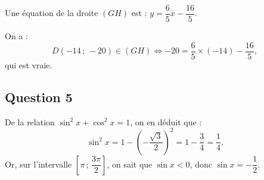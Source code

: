 Une équation de la droite \( (GH) \) est : \( y = \dfrac{6}{5}x - \dfrac{16}{5} \).

On a :
\[
D(-14 \,;\, -20) \in (GH) \iff -20 = \dfrac{6}{5} \times (-14) - \dfrac{16}{5},
\]
qui est vraie.


\subsection*{Question 5}

De la relation \( \sin^2 x + \cos^2 x = 1 \), on en déduit que :
\[
\sin^2 x = 1 - \left( -\dfrac{\sqrt{3}}{2} \right)^2 = 1 - \dfrac{3}{4} = \dfrac{1}{4}.
\]
Or, sur l'intervalle \( \left[ \pi \,;\, \dfrac{3\pi}{2} \right] \), on sait que \( \sin x < 0 \), donc \( \sin x = -\dfrac{1}{2} \).
